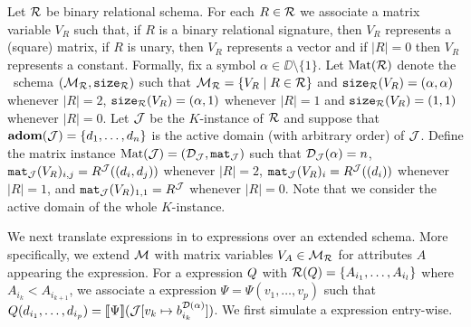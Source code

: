 Let $\mathcal{R}$ be binary relational schema. For each $R\in \mathcal{R}$ we associate a matrix variable 
$V_R$ such that, if $R$ is a binary relational signature, then $V_R$ represents a (square) matrix, 
if $R$ is unary, then $V_R$ represents a vector and if $|R|=0$ then $V_R$ represents a constant. Formally, 
fix a symbol $\alpha \in \DD \setminus \{1\}$. Let $\text{Mat}(\mathcal{R})$ denote the \lang \ schema
$(\mathcal{M}_{\mathcal{R}},\texttt{size}_{\mathcal{R}})$ such that $\mathcal{M}_{\mathcal{R}} = \{ V_R \mid R \in \mathcal{R}\}$ and $\texttt{size}_{\mathcal{R}}(V_R) = (\alpha, \alpha)$ 
whenever $|R| = 2$, $\texttt{size}_{\mathcal{R}}(V_R) = (\alpha, 1)$ whenever $|R|=1$ and $\texttt{size}_{\mathcal{R}}(V_R) = (1, 1)$ whenever $|R|=0$. 
Let $\mathcal{J}$ be the $K$-instance of $\mathcal{R}$ and suppose that $\mathbf{adom}(\mathcal{J}) = \{d_1, \ldots, d_n\}$ is 
the active domain (with arbitrary order) of $\mathcal{J}$. 
Define the matrix instance $\text{Mat}(\mathcal{J}) = (\mathcal{D}_{\mathcal{J}},\texttt{mat}_{\mathcal{J}})$ such 
that $\mathcal{D}_{\mathcal{J}}(\alpha) = n$, $\texttt{mat}_{\mathcal{J}}(V_R)_{i,j} = R^{\mathcal{J}}((d_i, d_j))$ whenever $|R|=2$, $\texttt{mat}_{\mathcal{J}}(V_R)_{i} = R^{\mathcal{J}}((d_i))$ 
whenever $|R|=1$, 
and $\texttt{mat}_{\mathcal{J}}(V_R)_{1,1} = R^{\mathcal{J}}$ whenever $|R|=0$. 
Note that we consider the active domain of the whole $K$-instance.

We next translate \rak expressions in to \langsum expressions over an extended schema. More specifically, we extend 
$\mathcal{M}$ with matrix variables $V_A\in\mathcal{M}_{\mathcal{R}} $ for attributes $A$ appearing the \rak expression. For a \rak expression
$Q$ with $\mathcal{R}(Q)=\lbrace A_{i_1}, \ldots, A_{i_l}\rbrace$ where $A_{i_k}<A_{i_{k+1}}$, we associate a 
\langfor expression $\Psi=\Psi(v_{1}, \ldots, v_{p})$ such that $ Q(d_{i_1}, \ldots, d_{i_p}) = \llbracket \Psi \rrbracket(\mathcal{J}[v_{k}\mapsto b^{\mathcal{D}(\alpha)}_{i_{k}}])$.
We first simulate a \rak expression entry-wise.

